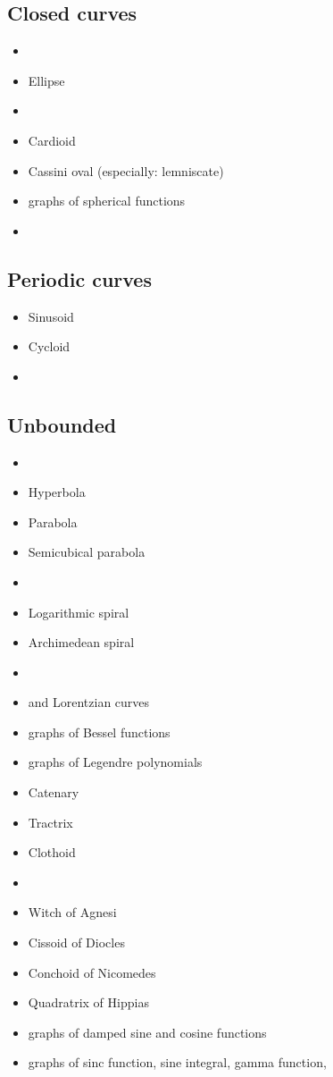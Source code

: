 \documentclass[12pt]{article}
\begin{document}
\subsection*{Closed curves}
\begin{itemize}
\item {}
\item Ellipse
\item {}
\item Cardioid
\item Cassini oval (especially: lemniscate)
\item graphs of spherical functions
\item {}
\end{itemize}

\subsection*{Periodic curves}
\begin{itemize}
\item Sinusoid
\item Cycloid
\item {}
\end{itemize}

\subsection*{Unbounded}
\begin{itemize}
\item {}
\item Hyperbola
\item Parabola
\item Semicubical parabola
\item {}
\item Logarithmic spiral
\item Archimedean spiral
\item {}
\item {} and Lorentzian curves
\item graphs of Bessel functions
\item graphs of Legendre polynomials
\item Catenary
\item Tractrix
\item Clothoid
\item {}
\item Witch of Agnesi
\item Cissoid of Diocles
\item Conchoid of Nicomedes
\item Quadratrix of Hippias
\item graphs of damped sine and cosine functions
\item graphs of sinc function, sine integral, gamma function, 
\end{itemize}
\end{document}
